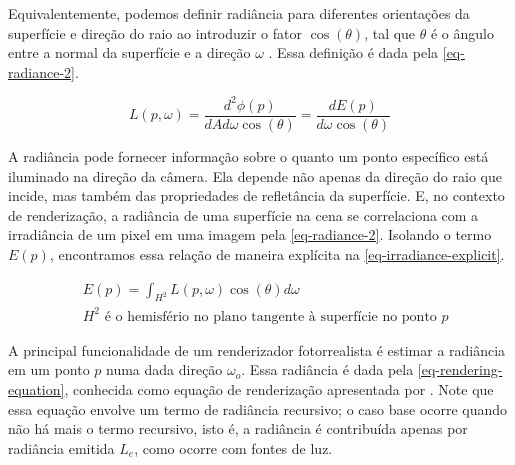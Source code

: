 \documentclass[english, 
               brazil, 
               bsc] %
               {dcomp-abntex2}
\begin{document}


Equivalentemente, podemos definir radiância para diferentes orientações da superfície e direção do raio ao introduzir o fator $\cos(\theta)$, tal que $\theta$ é o ângulo entre a normal da superfície e a direção ${\omega}$ \cite[5.4.1]{pbr}. Essa definição é dada pela \autoref{eq-radiance-2}. 


\begin{equation} \label{eq-radiance-2}
  L(p,{\omega}) = \frac{d^2\phi(p)}{dAd{\omega} \cos(\theta)} = \frac{dE(p)}{d{\omega} \cos(\theta)} 
\end{equation}




A radiância pode fornecer informação sobre o quanto um ponto específico está iluminado na direção da câmera. Ela depende não apenas da direção do raio que incide, mas também das propriedades de refletância da superfície. E, no contexto de renderização, a radiância de uma superfície na cena se correlaciona com a irradiância de um pixel em uma imagem pela \autoref{eq-radiance-2}. Isolando o termo $E(p)$, encontramos essa relação de maneira explícita na \autoref{eq-irradiance-explicit}.


\begin{equation} \label{eq-irradiance-explicit}
  \begin{aligned}
  &E(p) = \int_{H^2}{L(p,{\omega})\cos(\theta)d{\omega}}\\
  &H^2 \text{ é o hemisfério no plano tangente à superfície no ponto $p$}
  \end{aligned}
\end{equation}




A principal funcionalidade de um renderizador fotorrealista é estimar a radiância em um ponto $p$ numa dada direção ${\omega}_o$. Essa radiância é dada pela \autoref{eq-rendering-equation}, conhecida como equação de renderização apresentada por . Note que essa equação envolve um termo de radiância recursivo; o caso base ocorre quando não há mais o termo recursivo, isto é, a radiância é contribuída apenas por radiância emitida $L_e$, como ocorre com fontes de luz.
\end{document}
